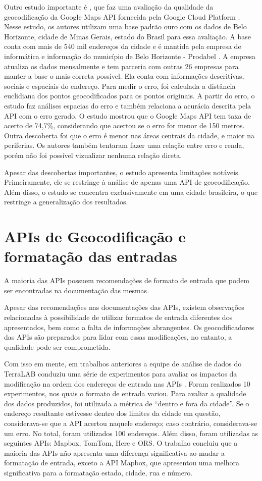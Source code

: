 Outro estudo importante é \cite{Clodoveu2011}, que faz uma avaliação da qualidade da geocodificação da Google Maps API fornecida pela Google Cloud Platform \cite{GCP}. Nesse estudo, os autores utilizam uma base padrão ouro com os dados de Belo Horizonte, cidade de Minas Gerais, estado do Brasil para essa avaliação. A base conta com mais de 540 mil endereços da cidade e é mantida pela empresa de informática e informação do município de Belo Horizonte - Prodabel \cite{Prodabel}. A empresa atualiza os dados mensalmente e tem parceria com outras 26 empresas para manter a base o mais correta possível. Ela conta com informações descritivas, sociais e espaciais do endereço. Para medir o erro, foi calculada a distância euclidiana dos pontos geocodificados para os pontos originais. A partir do erro, o estudo faz análises espacias do erro e também relaciona a acurácia descrita pela API com o erro gerado. O estudo mostrou que o Google Maps API tem taxa de acerto de 74,7\%, considerando que acertou se o erro for menor de 150 metros. Outra descoberta foi que o erro é menor nas áreas centrais da cidade, e maior na periferias. Os autores também tentaram fazer uma relação entre erro e renda, porém não foi possível vizualizar nenhuma relação direta.

Apesar das descobertas importantes, o estudo apresenta limitações notáveis. Primeiramente, ele se restringe à análise de apenas uma API de geocodificação. Além disso, o estudo se concentra exclusivamente em uma cidade brasileira, o que restringe a generalização dos resultados. 

\section{APIs de Geocodificação e  formatação das entradas}

A maioria das APIs possuem recomendações de formato de entrada que podem ser encontradas na documentação das mesmas. 

Apesar das recomendações nas documentações das APIs, existem observações relacionadas à possibilidade de utilizar formatos de entrada diferentes dos apresentados, bem como a falta de informações abrangentes. Os geocodificadores das APIs são preparados para lidar com essas modificações, no entanto, a qualidade pode ser comprometida.

Com isso em mente, em trabalhos anteriores a equipe de análise de dados do TerraLAB \cite{terralab} conduziu uma série de experimentos para avaliar os impactos da modificação na ordem dos endereços de entrada nas APIs \cite{relatorioDeA}. Foram realizados 10 experimentos, nos quais o formato de entrada variou. Para avaliar a qualidade dos dados produzidos, foi utilizada a métrica de ``dentro e fora da cidade''. Se o endereço resultante estivesse dentro dos limites da cidade em questão, considerava-se que a API acertou naquele endereço; caso contrário, considerava-se um erro. No total, foram utilizados 100 endereços. Além disso, foram utilizadas as seguintes APIs: Mapbox, TomTom, Here e ORS. O trabalho concluiu que a maioria das APIs não apresenta uma diferença significativa ao mudar a formatação de entrada, exceto a API Mapbox, que apresentou uma melhora significativa para a formatação estado, cidade, rua e número.

